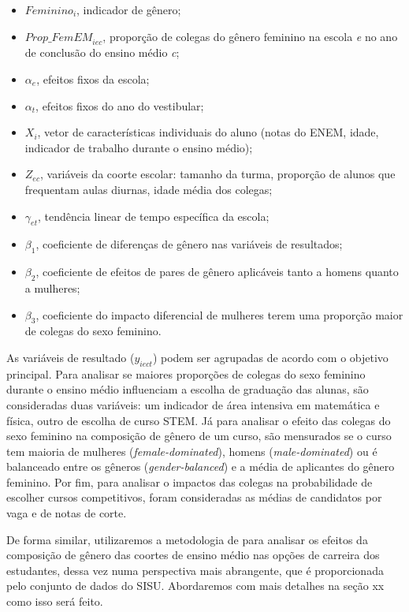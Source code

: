 \begin{itemize}
  \item $\textit{Feminino}_i$, indicador de gênero;
  \item $\textit{Prop\_FemEM}_{iec}$, proporção de colegas do gênero feminino na escola \textit{e} no ano de conclusão do ensino médio \textit{c};
  \item $\alpha_e$, efeitos fixos da escola;
  \item $\alpha_t$, efeitos fixos do ano do vestibular;
  \item $X_i$, vetor de características individuais do aluno (notas do ENEM, idade, indicador de trabalho durante o ensino médio);
  \item $Z_{ec}$, variáveis da coorte escolar: tamanho da turma, proporção de alunos que frequentam aulas diurnas, idade média dos colegas;
  \item $\gamma_{et}$, tendência linear de tempo específica da escola;
  \item $\beta_1$, coeficiente de diferenças de gênero nas variáveis de resultados;
  \item $\beta_2$, coeficiente de efeitos de pares de gênero aplicáveis tanto a homens quanto a mulheres;
  \item $\beta_3$, coeficiente do impacto diferencial de mulheres terem uma proporção maior de colegas do sexo feminino.
\end{itemize}

As variáveis de resultado ($y_{iect}$) podem ser agrupadas de acordo com o objetivo principal. Para analisar se maiores proporções de colegas do sexo feminino durante o ensino médio influenciam a escolha de graduação das alunas, são consideradas duas variáveis: um indicador de área intensiva em matemática e física, outro de escolha de curso STEM.  Já para analisar o efeito das colegas do sexo feminino na composição de gênero de um curso, são mensurados se o curso tem maioria de mulheres (\textit{female-dominated}), homens (\textit{male-dominated}) ou é balanceado entre os gêneros (\textit{gender-balanced}) e a média de aplicantes do gênero feminino. Por fim, para analisar o impactos das colegas na probabilidade de escolher cursos competitivos, foram consideradas as médias de candidatos por vaga e de notas de corte.

De forma similar, utilizaremos a metodologia de \citet{Borges2021} para analisar os efeitos da composição de gênero das coortes de ensino médio nas opções de carreira dos estudantes, dessa vez numa perspectiva mais abrangente, que é proporcionada pelo conjunto de dados do SISU. Abordaremos com mais detalhes na seção xx como isso será feito.